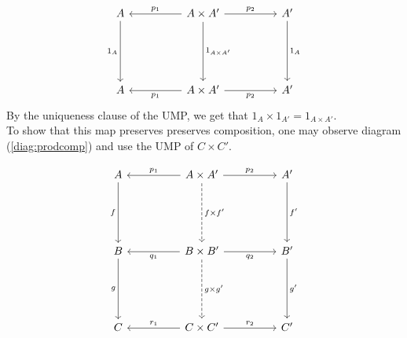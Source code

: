 \documentclass[11pt,leqno,landscape,semhelv]{seminar}
\numberwithin{equation}{section}
\theoremstyle{definition}
\numberwithin{thm}{section}
\numberwithin{equation}{section}
\begin{document}
\begin{equation*} 
	\begin{tikzcd}
	A \arrow[ddd, "1_A"'] &  & A \times A' \arrow[ll, "p_1"'] \arrow[rr, "p_2"] \arrow[ddd, "1_{A \times A'}"] &  & A' \arrow[ddd, "1_A"] \\&&&&\\&&&&\\
	A &  & A\times A' \arrow[ll, "p_1"]\arrow[rr, "p_2"']&&A'                  
	\end{tikzcd}
\end{equation*}	
By the uniqueness clause of the UMP, we get that $1_A \times 1_{A'} = 1_{A\times A'}.$\\
To show that this map preserves preserves composition, one may observe diagram (\ref{diag:prodcomp}) and use the UMP of $C \times C'.$

\begin{equation} \label{diag:prodcomp}
	\begin{tikzcd}
A \arrow[ddd, "f"'] &  & A \times A' \arrow[ll, "p_1"'] \arrow[rr, "p_2"] \arrow[ddd, "f\times f'", dashed] &  & A' \arrow[ddd, "f'"] \\
                    &  &                                                                                    &  &                      \\
                    &  &                                                                                    &  &                      \\
B \arrow[ddd, "g"'] &  & B\times B' \arrow[ll, "q_1"] \arrow[rr, "q_2"'] \arrow[ddd, "g\times g'", dashed]  &  & B' \arrow[ddd, "g'"] \\
                    &  &                                                                                    &  &                      \\
                    &  &                                                                                    &  &                      \\
C                   &  & C\times C' \arrow[ll, "r_1"'] \arrow[rr, "r_2"]                                    &  & C'                  
\end{tikzcd}
\end{equation}
\end{document}
